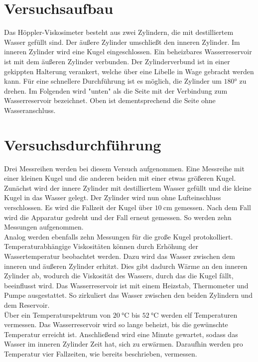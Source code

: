 


\section{Versuchsaufbau}
Das Höppler-Viskosimeter besteht aus zwei Zylindern, die mit destilliertem Wasser gefüllt sind. 
Der äußere Zylinder umschließt den inneren Zylinder. Im inneren Zylinder wird eine Kugel 
eingeschlossen. Ein beheizbares Wasserreservoir ist mit dem äußeren Zylinder verbunden. 
Der Zylinderverbund ist in einer gekippten Halterung verankert, welche über eine Libelle 
in Wage gebracht werden kann. Für eine schnellere Durchführung ist es möglich, die Zylinder um 
$\ang{180;;}$ zu drehen. Im Folgenden wird "unten" als die Seite mit der Verbindung zum Wasserreservoir 
bezeichnet. Oben ist dementsprechend die Seite ohne Wasseranschluss. 


\section{Versuchsdurchführung}
Drei Messreihen werden bei diesem Versuch aufgenommen. Eine Messreihe mit einer kleinen Kugel 
und die anderen beiden mit einer etwas größeren Kugel. Zunächst wird der innere Zylinder mit  
destilliertem Wasser gefüllt und die kleine Kugel in das Wasser gelegt. Der Zylinder wird nun 
ohne Lufteinschluss verschlossen. Es wird die Fallzeit der Kugel über $\qty{10}{\centi \meter}$
gemessen. Nach dem Fall wird die Apparatur gedreht und der Fall erneut gemessen. So werden zehn 
Messungen aufgenommen.\\
\noindent Analog werden ebenfalls zehn Messungen für die große Kugel protokolliert. \\
\noindent Temperaturabhängige Viskositäten können durch Erhöhung der Wassertemperatur beobachtet werden. 
Dazu wird das Wasser zwischen dem inneren und äußeren Zylinder erhitzt. Dies gibt dadurch Wärme 
an den inneren Zylinder ab, wodurch die Viskosität des Wassers, durch das die Kugel fällt, beeinflusst wird.
Das Wasserreservoir ist mit einem Heizstab, Thermometer und Pumpe ausgestattet. So zirkuliert das Wasser 
zwischen den beiden Zylindern und dem Reservoir.\\
Über ein Temperaturspektrum von $\qty{20}{\celsius}$ bis $\qty{52}{\celsius}$ werden elf Temperaturen vermessen. 
Das Wasserreservoir wird so lange beheizt, bis die gewünschte Temperatur erreicht ist. Anschließend wird eine 
Minute gewartet, sodass das Wasser im inneren Zylinder Zeit hat, sich zu erwärmen. Daraufhin werden pro Temperatur 
vier Fallzeiten, wie bereits beschrieben, vermessen.

